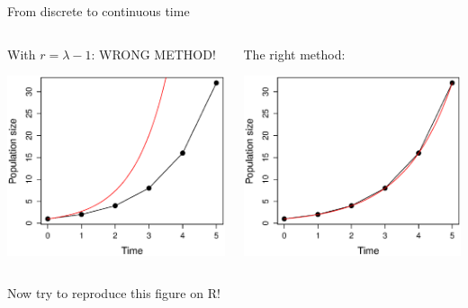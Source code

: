 \documentclass{eecslides}
\begin{document}

	\begin{frame}{From discrete to continuous time}

		\begin{columns}
			\begin{column}{0.5\textwidth}			
			With $r = \lambda - 1$: WRONG METHOD!
				\begin{center}
					\includegraphics[height=0.5\textheight]{geo_vs_exp_wrong.eps}
				\end{center}
			\end{column}
			\begin{column}{0.5\textwidth}
			The right method:
				\begin{center}
					\includegraphics[height=0.5\textheight]{geo_vs_exp_right.eps}
				\end{center}
			\end{column}
		\end{columns}	 

	\alert{Now try to reproduce this figure on R!}

	\end{frame}
\end{document}
